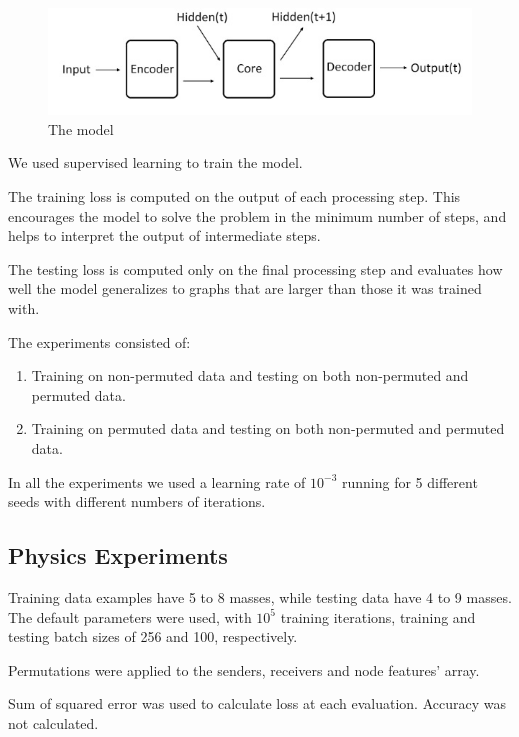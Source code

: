 \begin{figure}[H]
    \centering
    \includegraphics[width=.7\textwidth]{fig/content/model/model.jpg}
    \caption{The model}
    \label{fig:model}
\end{figure}

We used supervised learning to train the model. 

The training loss is computed on the output of each processing step. This encourages the model to solve the problem in the minimum number of steps, and helps to interpret the output of intermediate steps.

The testing loss is computed only on the final processing step and evaluates how well the model generalizes to graphs that are larger than those it was trained with.

The experiments consisted of:

\begin{enumerate}[label=(\Alph*)]

    \item Training on non-permuted data and testing on both non-permuted  and permuted data.
    
    \item Training on permuted data and testing on both non-permuted and permuted data.

\end{enumerate}

In all the experiments we used a learning rate of $10^{-3}$ running for 5 different seeds with different numbers of iterations.

\subsection{Physics Experiments}

Training data examples have 5 to 8 masses, while testing data have 4 to 9 masses. The default parameters were used, with $10^5$ training iterations, training and testing batch sizes of 256 and 100, respectively.

Permutations were applied to the senders, receivers and node features' array.

Sum of squared error was used to calculate loss at each evaluation. Accuracy was not calculated.

